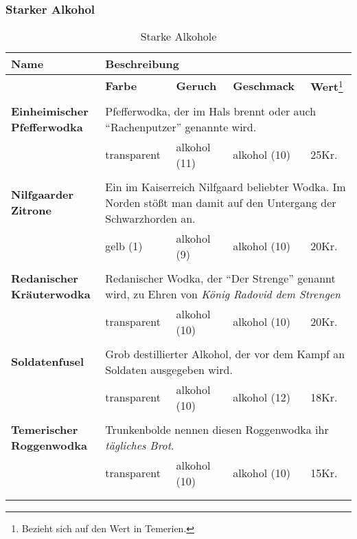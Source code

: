 \subsubsection{Starker Alkohol}

\begin{longtable}{|p{6cm}|p{}|p{}|p{}|p{1cm}|}
\hline
\textbf{Name} & \multicolumn{4}{p{10cm}|}{\textbf{Beschreibung}} \\ \hline
\multicolumn{1}{r|}{} & \textbf{Farbe} & \textbf{Geruch} & \textbf{Geschmack} & \textbf{Wert}\footnote{Bezieht sich auf den Wert in Temerien.} \\ \cline{2-5}
\multicolumn{5}{c}{} \\ \hline

\textbf{Einheimischer Pfefferwodka} & \multicolumn{4}{p{10cm}|}{Pfefferwodka, der im Hals brennt oder auch "`Rachenputzer"' genannte wird.} \\ \hline
\multicolumn{1}{r|}{} & transparent & alkohol (11) & alkohol (10) & 25Kr. \\ \cline{2-5}

\multicolumn{5}{c}{} \\ \hline

\textbf{Nilfgaarder Zitrone} & \multicolumn{4}{p{10cm}|}{Ein im Kaiserreich Nilfgaard beliebter Wodka. Im Norden stößt man damit auf den Untergang der Schwarzhorden an.} \\ \hline
\multicolumn{1}{r|}{} & gelb (1) & alkohol (9) & alkohol (10) & 20Kr. \\ \cline{2-5}

\multicolumn{5}{c}{} \\ \hline

\textbf{Redanischer Kräuterwodka} & \multicolumn{4}{p{10cm}|}{Redanischer Wodka, der "`Der Strenge"' genannt wird, zu Ehren von \textit{König Radovid dem Strengen}} \\ \hline
\multicolumn{1}{r|}{} & transparent & alkohol (10) & alkohol (10) & 20Kr. \\ \cline{2-5}

\multicolumn{5}{c}{} \\ \hline

\textbf{Soldatenfusel} & \multicolumn{4}{p{10cm}|}{Grob destillierter Alkohol, der vor dem Kampf an Soldaten ausgegeben wird.} \\ \hline
\multicolumn{1}{r|}{} & transparent & alkohol (10) & alkohol (12) & 18Kr. \\ \cline{2-5}

\multicolumn{5}{c}{} \\ \hline

\textbf{Temerischer Roggenwodka} & \multicolumn{4}{p{10cm}|}{Trunkenbolde nennen diesen Roggenwodka ihr \textit{tägliches Brot}. } \\ \hline
\multicolumn{1}{r|}{} & transparent & alkohol (10) & alkohol (10) & 15Kr. \\ \cline{2-5}

\multicolumn{5}{c}{} \\ 

\caption{Starke Alkohole}
\label{tab:starke_alkohole}
\end{longtable}


